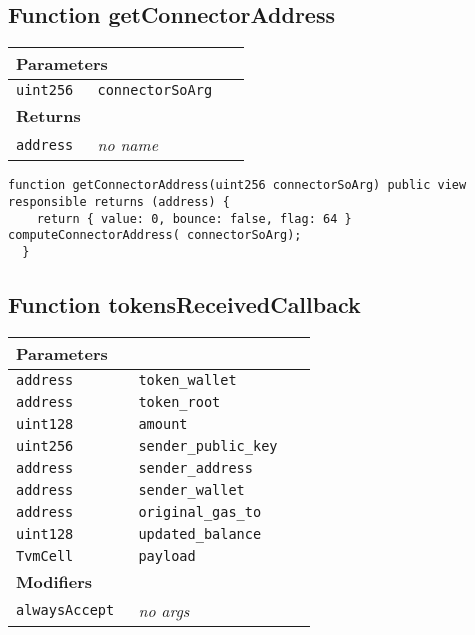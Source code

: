 \subsection{Function getConnectorAddress}


\ifsoltables
\noindent\begin{tabular}{|l|l|p{5cm}|}\hline
\multicolumn{3}{|l|}{\bf Parameters}\\\hline
\tt uint256 & \tt connectorSoArg &\\\hline
\multicolumn{3}{|l|}{\bf Returns}\\\hline
\tt address & {\em no name} &\\\hline
\end{tabular}
\fi

\vspace{2cm}

\begin{lstlisting}[firstnumber=108]
  function getConnectorAddress(uint256 connectorSoArg) public view responsible returns (address) {
    return { value: 0, bounce: false, flag: 64 } computeConnectorAddress( connectorSoArg);
  }
\end{lstlisting}

\subsection{Function tokensReceivedCallback}


\ifsoltables
\noindent\begin{tabular}{|l|l|p{5cm}|}\hline
\multicolumn{3}{|l|}{\bf Parameters}\\\hline
\tt address & \tt token\_{}wallet &\\\hline
\tt address & \tt token\_{}root &\\\hline
\tt uint128 & \tt amount &\\\hline
\tt uint256 & \tt sender\_{}public\_{}key &\\\hline
\tt address & \tt sender\_{}address &\\\hline
\tt address & \tt sender\_{}wallet &\\\hline
\tt address & \tt original\_{}gas\_{}to &\\\hline
\tt uint128 & \tt updated\_{}balance &\\\hline
\tt TvmCell & \tt payload &\\\hline
\multicolumn{3}{|l|}{\bf Modifiers}\\\hline
\tt alwaysAccept & {\em no args} &\\\hline
\end{tabular}
\fi

